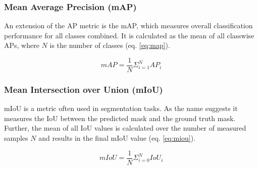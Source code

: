 \subsubsection{Mean Average Precision (mAP)}

An extension of the \ac{AP} metric is the \ac{mAP}, which measures overall classification performance for all classes combined.
It is calculated as the mean of all classwise \acp{AP}, where $N$ is the number of classes (eq. \ref{eq:map}).

\begin{equation}
    mAP = \frac{1}{N} \Sigma_{i=1}^N AP_i
    \label{eq:map}
\end{equation}

\subsubsection{Mean Intersection over Union (mIoU)}

\ac{mIoU} is a metric often used in segmentation tasks.
As the name suggests it measures the \ac{IoU} between the predicted mask and the ground truth mask.
Further, the mean of all \ac{IoU} values is calculated over the number of measured samples $N$ and results in the final \ac{mIoU} value (eq. \ref{eq:miou}).

\begin{equation}
    mIoU = \frac{1}{N} \Sigma_{i=0}^{N} IoU_i
    \label{eq:miou}
\end{equation}
